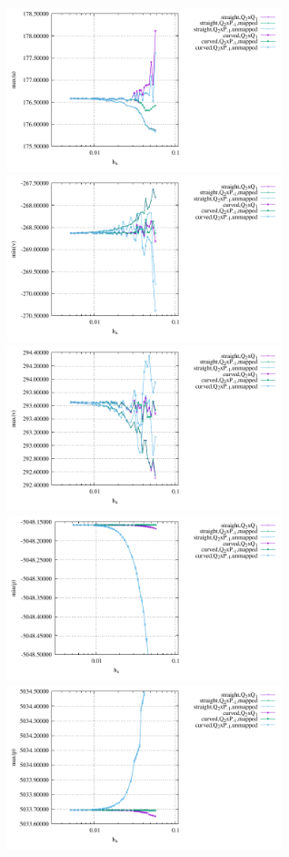 \begin{center}
\includegraphics[width=8cm]{python_codes/fieldstone_25/results/isoviscous/max_u.pdf}\\
\includegraphics[width=8cm]{python_codes/fieldstone_25/results/isoviscous/min_v.pdf}
\includegraphics[width=8cm]{python_codes/fieldstone_25/results/isoviscous/max_v.pdf}\\
\includegraphics[width=8cm]{python_codes/fieldstone_25/results/isoviscous/min_p.pdf}
\includegraphics[width=8cm]{python_codes/fieldstone_25/results/isoviscous/max_p.pdf}\\
\end{center}



